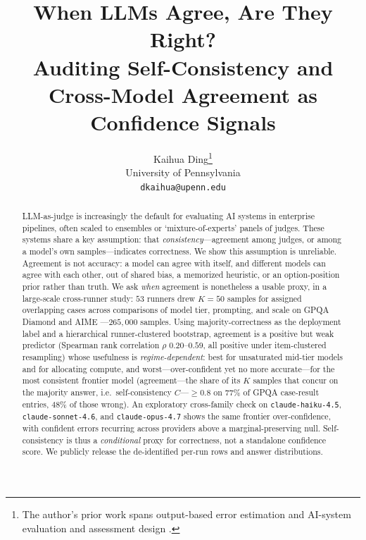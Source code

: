 \documentclass[11pt]{article}
\title{When LLMs Agree, Are They Right?\\
Auditing Self-Consistency and Cross-Model Agreement as Confidence Signals}
\author{Kaihua Ding\thanks{The author's prior work spans output-based error
  estimation \citep{ding2018dissertation} and AI-system evaluation and
  assessment design \citep{ding2025airesilient}.} \\
  University of Pennsylvania \\
  \texttt{dkaihua@upenn.edu}}
\newcommand{\C}{\textit{C}}
\begin{document}
\maketitle

\begin{abstract}
LLM-as-judge \citep{zheng2023judging} is increasingly the default for evaluating AI systems in
enterprise pipelines, often scaled to ensembles \citep{verga2024poll} or `mixture-of-experts'
\citep{shazeer2017moe} panels of judges. These systems share a key assumption:
that \emph{consistency}---agreement among judges, or among a model's own samples---indicates
correctness. We show this assumption is unreliable. Agreement is not accuracy: a model can agree with
itself, and different models can agree with each other, out of shared bias, a memorized heuristic, or
an option-position prior rather than truth. We ask \emph{when} agreement is nonetheless a usable proxy, in a
large-scale cross-runner study: $53$ runners drew $K{=}50$ samples for assigned overlapping cases
across comparisons of model tier, prompting, and scale on GPQA Diamond \citep{rein2024gpqa} and AIME \citep{aime}---$265{,}000$ samples.
Using majority-correctness as the deployment label and a hierarchical runner-clustered bootstrap,
agreement is a positive but weak predictor (Spearman rank correlation $\rho$ $0.20$--$0.59$, all positive under item-clustered
resampling) whose usefulness is \emph{regime-dependent}: best for unsaturated mid-tier models and for
allocating compute, and worst---over-confident yet no more accurate---for the most consistent frontier
model (agreement---the share of its $K$ samples that concur on the majority answer, i.e.\ self-consistency $\C$---$\geq0.8$ on $77\%$ of GPQA case-result entries, $48\%$ of those wrong). An exploratory
cross-family check on \texttt{claude-haiku-4.5}, \texttt{claude-sonnet-4.6}, and \texttt{claude-opus-4.7} shows the same frontier over-confidence, with confident errors
recurring across providers above a marginal-preserving null. Self-consistency is thus a \emph{conditional}
proxy for correctness, not a standalone confidence score. We publicly release the de-identified
per-run rows and answer distributions.
\end{abstract}
\end{document}
